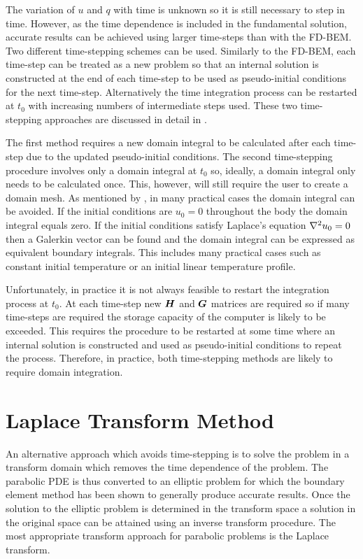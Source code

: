 The variation of $u$ and $q$ with time is unknown so it is still necessary
to step in time.  However, as the time dependence is included in the
fundamental solution, accurate results can be achieved using larger
time-steps than with the FD-BEM.  Two different time-stepping schemes can
be used.  Similarly to the FD-BEM, each time-step can be treated as a new
problem so that an internal solution is constructed at the end of each
time-step to be used as pseudo-initial conditions for the next time-step.
Alternatively the time integration process can be restarted at $t_{0}$ with
increasing numbers of intermediate steps used.  These two time-stepping
approaches are discussed in detail in .

The first method requires a new domain integral to be calculated after each
time-step due to the updated pseudo-initial conditions.  The second
time-stepping procedure involves only a domain integral at $t_{0}$ so,
ideally, a domain integral only needs to be calculated once. This, however,
will still require the user to create a domain mesh. As mentioned by
, in many practical cases the domain integral can
be avoided. If the initial conditions are $u_{0} = 0$ throughout the body
the domain integral equals zero. If the initial conditions satisfy
Laplace's equation $\nabla^{2} {u_{0}} = 0$ then a Galerkin vector can be found
and the domain integral can be expressed as equivalent boundary integrals.
This includes many practical cases such as constant initial temperature or
an initial linear temperature profile.

Unfortunately, in practice it is not always feasible to restart the
integration process at $t_{0}$. At each time-step new $\matr{H}$ and
$\matr{G}$ matrices are required so if many time-steps are required the
storage capacity of the computer is likely to be exceeded.  This requires
the procedure to be restarted at some time where an internal solution is
constructed and used as pseudo-initial conditions to repeat the process.
Therefore, in practice, both time-stepping methods are likely to require
domain integration.

\section{Laplace Transform Method}

An alternative approach which avoids time-stepping is to solve the problem
in a transform domain which removes the time dependence of the problem.
The parabolic PDE is thus converted to an elliptic problem for which the
boundary element method has been shown to generally produce accurate
results.  Once the solution to the elliptic problem is determined in the
transform space a solution in the original space can be attained using an
inverse transform procedure.  The most appropriate transform approach for
parabolic problems is the Laplace transform.

